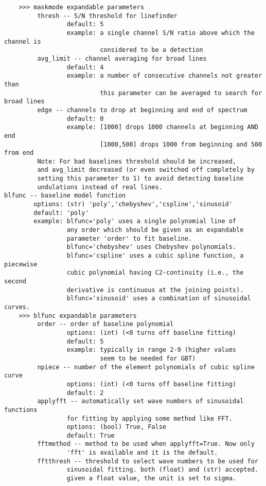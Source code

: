 \begin{verbatim}
    >>> maskmode expandable parameters
         thresh -- S/N threshold for linefinder
                 default: 5
                 example: a single channel S/N ratio above which the channel is
                          considered to be a detection
         avg_limit -- channel averaging for broad lines
                 default: 4
                 example: a number of consecutive channels not greater than
                          this parameter can be averaged to search for broad lines
         edge -- channels to drop at beginning and end of spectrum
                 default: 0
                 example: [1000] drops 1000 channels at beginning AND end
                          [1000,500] drops 1000 from beginning and 500 from end
         Note: For bad baselines threshold should be increased,
         and avg_limit decreased (or even switched off completely by
         setting this parameter to 1) to avoid detecting baseline
         undulations instead of real lines.
blfunc -- baseline model function
        options: (str) 'poly','chebyshev','cspline','sinusoid'
        default: 'poly'
        example: blfunc='poly' uses a single polynomial line of 
                 any order which should be given as an expandable 
                 parameter 'order' to fit baseline. 
                 blfunc='chebyshev' uses Chebyshev polynomials. 
                 blfunc='cspline' uses a cubic spline function, a piecewise 
                 cubic polynomial having C2-continuity (i.e., the second 
                 derivative is continuous at the joining points). 
                 blfunc='sinusoid' uses a combination of sinusoidal curves. 
    >>> blfunc expandable parameters
         order -- order of baseline polynomial
                 options: (int) (<0 turns off baseline fitting)
                 default: 5
                 example: typically in range 2-9 (higher values
                          seem to be needed for GBT)
         npiece -- number of the element polynomials of cubic spline curve
                 options: (int) (<0 turns off baseline fitting)
                 default: 2
         applyfft -- automatically set wave numbers of sinusoidal functions 
                 for fitting by applying some method like FFT.
                 options: (bool) True, False
                 default: True
         fftmethod -- method to be used when applyfft=True. Now only 
                 'fft' is available and it is the default.
         fftthresh -- threshold to select wave numbers to be used for 
                 sinusoidal fitting. both (float) and (str) accepted.
                 given a float value, the unit is set to sigma.

\end{verbatim}
